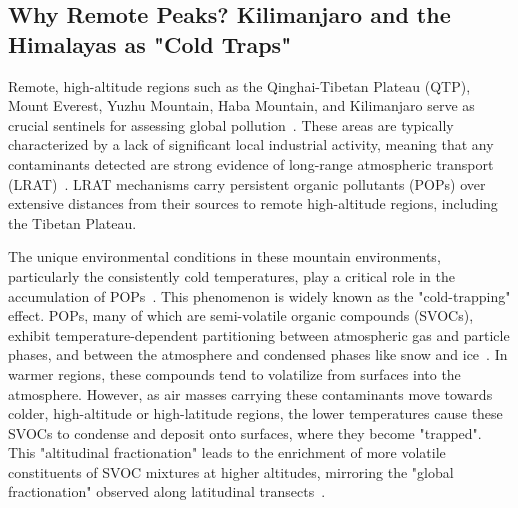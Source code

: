 \documentclass[11pt]{article}
\begin{document}
\begin{doublespace}
    \subsection{Why Remote Peaks? Kilimanjaro and the Himalayas as "Cold Traps"}
        Remote, high-altitude regions such as the Qinghai-Tibetan Plateau (QTP), Mount Everest, Yuzhu Mountain, Haba Mountain, and Kilimanjaro serve as crucial sentinels for assessing global pollution~\cite{Wenkai}.
        These areas are typically characterized by a lack of significant local industrial activity, meaning that any contaminants detected are strong evidence of long-range atmospheric transport (LRAT)~\cite{Daly2005}.
        LRAT mechanisms carry persistent organic pollutants (POPs) over extensive distances from their sources to remote high-altitude regions, including the Tibetan Plateau.

        The unique environmental conditions in these mountain environments, particularly the consistently cold temperatures, play a critical role in the accumulation of POPs~\cite{Daly2005}.
        This phenomenon is widely known as the "cold-trapping" effect. POPs, many of which are semi-volatile organic compounds (SVOCs), exhibit temperature-dependent partitioning between atmospheric gas and particle phases, and between the atmosphere and condensed phases like snow and ice~\cite{Daly2005}.
        In warmer regions, these compounds tend to volatilize from surfaces into the atmosphere.
        However, as air masses carrying these contaminants move towards colder, high-altitude or high-latitude regions, the lower temperatures cause these SVOCs to condense and deposit onto surfaces, where they become "trapped".
        This "altitudinal fractionation" leads to the enrichment of more volatile constituents of SVOC mixtures at higher altitudes, mirroring the "global fractionation" observed along latitudinal transects~\cite{Daly2005}.


\end{doublespace}
\end{document}
